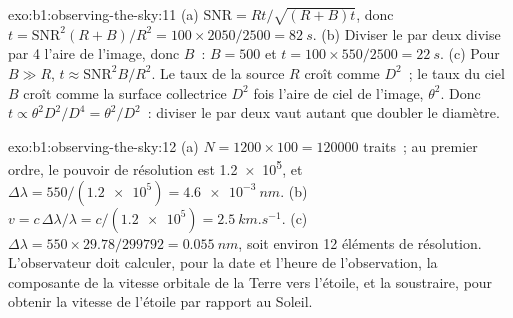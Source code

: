 \begin{solution}{exo:b1:observing-the-sky:11}
(a) $\mathrm{SNR} = Rt/\sqrt{(R + B)t}$, donc $t = \mathrm{SNR}^2(R + B)/R^2
= 100\times2050/2500 = \qty{82}{s}$. (b) Diviser le  par deux divise par 4
l'aire de l'image, donc $B$~: $B = 500$ et $t = 100\times550/2500 =
\qty{22}{s}$. (c) Pour $B \gg R$, $t \approx \mathrm{SNR}^2B/R^2$. Le taux de la
source $R$ croît comme $D^2$~; le taux du ciel $B$ croît comme la surface
collectrice $D^2$ fois l'aire de ciel de l'image, $\theta^2$. Donc $t \propto
\theta^2D^2/D^4 = \theta^2/D^2$~: diviser le  par deux vaut autant que
doubler le diamètre.
\end{solution}

\begin{solution}{exo:b1:observing-the-sky:12}
(a) $N = 1200\times100 = \num{120000}$ traits~; au premier ordre, le pouvoir de
résolution est \num{1.2e5}, et $\Delta\lambda = 550/(\num{1.2e5}) =
\qty{4.6e-3}{nm}$. (b) $v = c\,\Delta\lambda/\lambda = c/(\num{1.2e5}) =
\qty{2.5}{km.s^{-1}}$. (c) $\Delta\lambda = 550\times29.78/\num{299792} =
\qty{0.055}{nm}$, soit environ 12 éléments de résolution. L'observateur doit
calculer, pour la date et l'heure de l'observation, la composante de la vitesse
orbitale de la Terre vers l'étoile, et la soustraire, pour obtenir la vitesse de
l'étoile par rapport au Soleil.
\end{solution}

